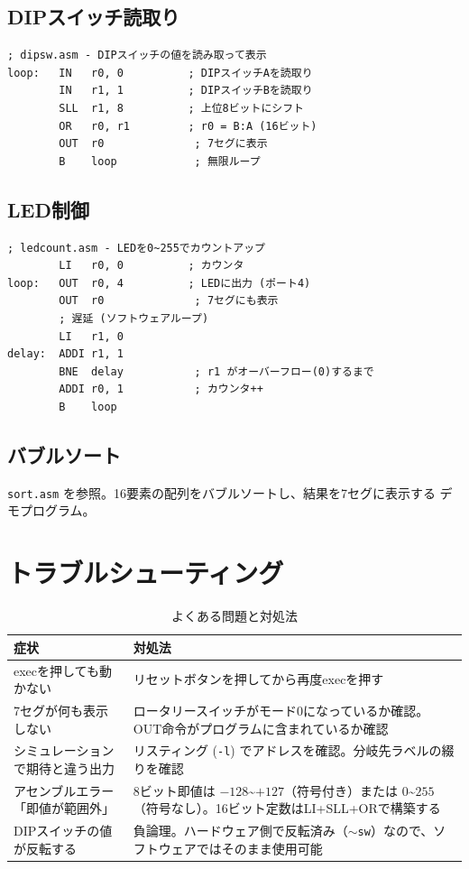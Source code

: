 \documentclass[a4paper,11pt]{ltjsarticle}
\begin{document}
\subsection{DIPスイッチ読取り}

\begin{lstlisting}[language={},caption={DIPスイッチの値を表示}]
; dipsw.asm - DIPスイッチの値を読み取って表示
loop:   IN   r0, 0          ; DIPスイッチAを読取り
        IN   r1, 1          ; DIPスイッチBを読取り
        SLL  r1, 8          ; 上位8ビットにシフト
        OR   r0, r1         ; r0 = B:A (16ビット)
        OUT  r0              ; 7セグに表示
        B    loop            ; 無限ループ
\end{lstlisting}

\subsection{LED制御}

\begin{lstlisting}[language={},caption={LEDをカウントアップ}]
; ledcount.asm - LEDを0~255でカウントアップ
        LI   r0, 0          ; カウンタ
loop:   OUT  r0, 4          ; LEDに出力 (ポート4)
        OUT  r0              ; 7セグにも表示
        ; 遅延 (ソフトウェアループ)
        LI   r1, 0
delay:  ADDI r1, 1
        BNE  delay           ; r1 がオーバーフロー(0)するまで
        ADDI r0, 1           ; カウンタ++
        B    loop
\end{lstlisting}

\subsection{バブルソート}

\texttt{sort.asm} を参照。16要素の配列をバブルソートし、結果を7セグに表示する
デモプログラム。


\section{トラブルシューティング}

\begin{table}[h]
\centering
\caption{よくある問題と対処法}
\small
\begin{tabular}{p{5cm}p{8cm}}
\toprule
症状 & 対処法 \\
\midrule
execを押しても動かない & リセットボタンを押してから再度execを押す \\
7セグが何も表示しない & ロータリースイッチがモード0になっているか確認。OUT命令がプログラムに含まれているか確認 \\
シミュレーションで期待と違う出力 & リスティング (\texttt{-l}) でアドレスを確認。分岐先ラベルの綴りを確認 \\
アセンブルエラー「即値が範囲外」 & 8ビット即値は $-128$\textasciitilde$+127$（符号付き）または $0$\textasciitilde$255$（符号なし）。16ビット定数はLI+SLL+ORで構築する \\
DIPスイッチの値が反転する & 負論理。ハードウェア側で反転済み（\texttt{$\sim$sw}）なので、ソフトウェアではそのまま使用可能 \\
\bottomrule
\end{tabular}
\end{table}
\end{document}
